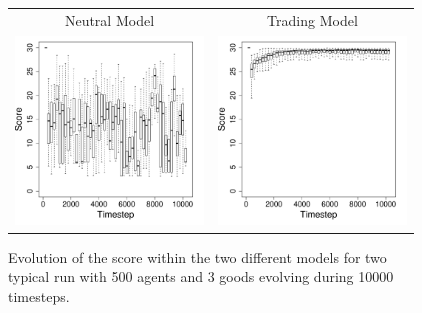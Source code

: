 \documentclass[a1paper,landscape,showframe,fontscale=.42]{baposter}
\begin{document}
\begin{poster}
{\begin{multicols}{2}
\begin{figure}[H]
	\centering
	\begin{tabular}{ c c}
		 Neutral Model & Trading Model \\
		 \includegraphics[width=5cm]{img/ScoreEvolutionForRandom-G3N500.pdf}
		 & \includegraphics[width=5cm]{img/ScoreEvolutionForTrade-G3N500.pdf}

	\end{tabular}
	\caption{Evolution of the score within the two different models for two typical run with 500 agents and 3 goods evolving during 10000 timesteps.}%
	\label{fig:scoreEvol}
\end{figure}


\end{multicols}}
\end{poster}
\end{document}
